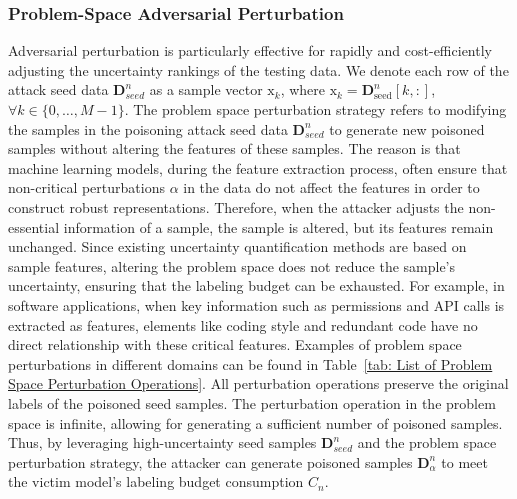 \subsubsection{Problem-Space Adversarial Perturbation}
\label{Sec: Strategy I-Problem-Space Perturbation}
Adversarial perturbation is particularly effective for rapidly and cost-efficiently adjusting the uncertainty rankings of the testing data.
We denote each row of the attack seed data $\bm{D}_{seed}^{n}$ as a sample vector $\bm{\mathrm{x}}_{k}$, where $\bm{\mathrm{x}}_{k} = \bm{D}_{\text{seed}}^{n}[k,:]$,$\forall k \in \{0, \dots, M-1 \}$.
The problem space perturbation strategy refers to modifying the samples in the poisoning attack seed data $\bm{D}_{seed}^{n}$ to generate new poisoned samples without altering the features of these samples.
The reason is that machine learning models, during the feature extraction process, often ensure that non-critical perturbations $\alpha$ in the data do not affect the features in order to construct robust representations.
Therefore, when the attacker adjusts the non-essential information of a sample, the sample is altered, but its features remain unchanged.
Since existing uncertainty quantification methods are based on sample features, altering the problem space does not reduce the sample's uncertainty, ensuring that the labeling budget can be exhausted.
For example, in software applications, when key information such as permissions and API calls is extracted as features, elements like coding style and redundant code have no direct relationship with these critical features.
Examples of problem space perturbations in different domains can be found in Table~\ref{tab: List of Problem Space Perturbation Operations}.
All perturbation operations preserve the original labels of the poisoned seed samples.
The perturbation operation in the problem space is infinite, allowing for generating a sufficient number of poisoned samples.
Thus, by leveraging high-uncertainty seed samples $\bm{D}_{seed}^{n}$ and the problem space perturbation strategy, the attacker can generate poisoned samples $\bm{D}_{\alpha}^{n}$ to meet the victim model's labeling budget consumption $C_{n}$.
